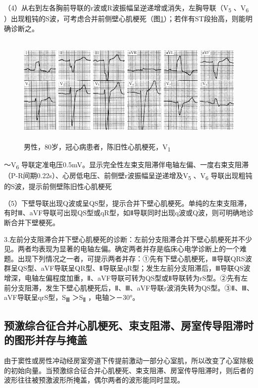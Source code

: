 （4）从右到左各胸前导联的r波或R波振幅呈逆递增或消失，左胸导联（V\textsubscript{5}
、V\textsubscript{6}
）出现粗钝的S波，可考虑合并前侧壁心肌梗死（图\ref{fig36-15}）；若伴有ST段抬高，则能明确诊断之。

\begin{figure}[!htbp]
 \centering
 \includegraphics[width=5.58333in,height=2.09375in]{./images/Image00587.jpg}
 \captionsetup{justification=centering}
 \caption{男性，80岁，冠心病患者，陈旧性心肌梗死，V\textsubscript{1}}
 \label{fig36-15}
  \end{figure} 
～V\textsubscript{6}
导联定准电压0.5mV。显示完全性左束支阻滞伴电轴左偏、一度右束支阻滞（P-R间期0.22s）、心房低电压、前侧壁r波振幅呈逆递增及V\textsubscript{5}
、V\textsubscript{6} 导联出现粗钝的S波，提示前侧壁陈旧性心肌梗死

（5）下壁导联出现Q波或呈QS型，提示合并下壁心肌梗死。单纯的左束支阻滞，有时Ⅲ、aVF导联可出现QS型或qR型，如Ⅱ导联同时出现q波或Q波，则可明确地诊断合并下壁梗死。

3.左前分支阻滞合并下壁心肌梗死的诊断：左前分支阻滞合并下壁心肌梗死并不少见。两者均表现为显著的电轴左偏。确定两者并存是临床心电学诊断上的一个难题。出现下列情况之一者，可提示两者并存：①先有下壁心肌梗死，Ⅲ导联QRS波群呈QS型、aVF导联呈QR型、Ⅱ导联呈qR型；发生左前分支阻滞后，Ⅲ导联QS波增深，电轴左偏程度加重，Ⅱ、aVF导联可转为QS型或Ⅱ导联转为rS型。②先有左前分支阻滞，发生下壁心肌梗死后，Ⅱ、Ⅲ、aVF导联r波消失转为QS型。③Ⅱ、Ⅲ、aVF导联呈qrS型，S\textsubscript{Ⅲ}
＞S\textsubscript{Ⅱ} ，电轴＞－30°。

\protect\hypertarget{text00043.htmlux5cux23subid479}{}{}

\subsection{预激综合征合并心肌梗死、束支阻滞、房室传导阻滞时的图形并存与掩盖}

由于窦性或房性冲动经房室旁道下传提前激动一部分心室肌，所以改变了心室除极的初始向量。当预激综合征合并心肌梗死、束支阻滞、房室传导阻滞时，则后者的波形往往被预激波形所掩盖，偶尔两者的波形能同时显现。

